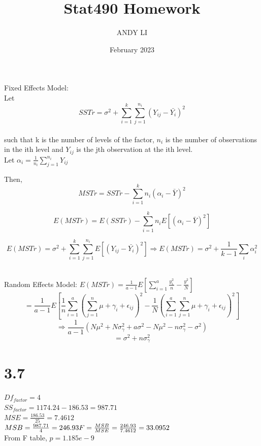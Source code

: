 \documentclass{article}
\title{Stat490 Homework}
\author{ANDY LI}
\date{February 2023}
\begin{document}
\maketitle
Fixed Effects Model:
\\Let $$SSTr = \sigma^2 + \sum_{i=1}^{k} \sum_{j=1}^{n_i} (Y_{ij} - \bar{Y_i})^2$$
\\
such that k is the number of levels of the factor, $n_i$ is the number of observations in the ith level and $Y_{ij}$ is the jth observation at the ith level.
\\
Let $\alpha_i = \frac{1}{n_i} \sum_{j=1}^{n_i} Y_{ij}$

Then, $$MSTr = SSTr - \sum_{i=1}^{k} n_i (\alpha_i - \bar{Y})^2$$

$$E(MSTr) = E(SSTr) - \sum_{i=1}^{k} n_i E[(\alpha_i - \bar{Y})^2]$$

$$E(MSTr) = \sigma^2 + \sum_{i=1}^{k} \sum_{j=1}^{n_i} E[(Y_{ij} - \bar{Y_i})^2] \Rightarrow 
E(MSTr) = \sigma^2 + \frac{1}{k-1}\sum_{i} \alpha_i^2$$

\\Random Effects Model:
$E(MSTr) = \frac{1}{a-1}E[\sum_{i=1}^a \frac{y_{i.}^2}{n}-\frac{y_{..}^2}{N}]$
$$= \frac{1}{a-1} E[\frac{1}{n} \sum_{i=1}^{a}(\sum_{j=1}^{n} \mu + \gamma_i + \epsilon_{ij})^2 - \frac{1}{N}(\sum_{i=1}^a \sum_{j=1}^n \mu + \gamma_i + \epsilon_{ij})^2]$$
$$\Rightarrow \frac{1}{a-1}(N\mu^2 + N\sigma_{\gamma}^2 + a\sigma^2 - N\mu^2 -n\sigma_{\gamma}^2-\sigma^2)$$
$$= \sigma^2 + n\sigma_{\gamma}^2$$

\section*{3.7}
$Df_{factor} = 4$       
\\$SS_{factor} = 1174.24 - 186.53 = 987.71$
\\$MSE = \frac{186.53}{25} = 7.4612$
\\$MSB = \frac{987.71}{4} = 246.93
\\F = \frac{MSB}{MSE} = \frac{246.93}{7.4612} = 33.0952$
\\From F table, $p = 1.185e-9$
\end{document}
